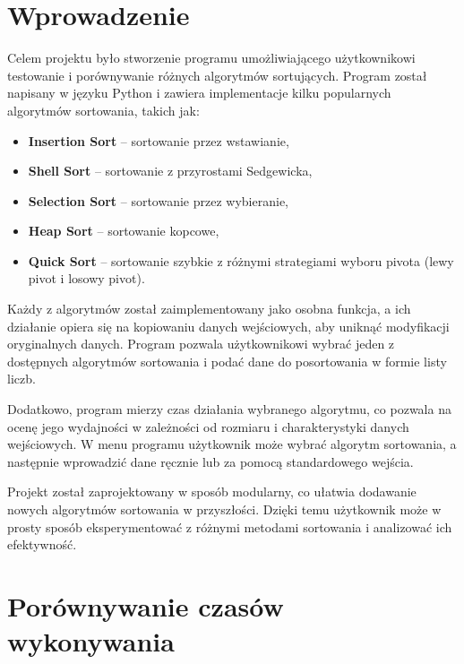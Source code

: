 \documentclass{article}
\begin{document}
	\section{Wprowadzenie}
	
	Celem projektu było stworzenie programu umożliwiającego użytkownikowi testowanie i porównywanie różnych algorytmów sortujących. Program został napisany w języku Python i zawiera implementacje kilku popularnych algorytmów sortowania, takich jak:
	
	\begin{itemize}
		\item \textbf{Insertion Sort} – sortowanie przez wstawianie,
		\item \textbf{Shell Sort} – sortowanie z przyrostami Sedgewicka,
		\item \textbf{Selection Sort} – sortowanie przez wybieranie,
		\item \textbf{Heap Sort} – sortowanie kopcowe,
		\item \textbf{Quick Sort} – sortowanie szybkie z różnymi strategiami wyboru pivota (lewy pivot i losowy pivot).
	\end{itemize}
	
	Każdy z algorytmów został zaimplementowany jako osobna funkcja, a ich działanie opiera się na kopiowaniu danych wejściowych, aby uniknąć modyfikacji oryginalnych danych. Program pozwala użytkownikowi wybrać jeden z dostępnych algorytmów sortowania i podać dane do posortowania w formie listy liczb.
	
	Dodatkowo, program mierzy czas działania wybranego algorytmu, co pozwala na ocenę jego wydajności w zależności od rozmiaru i charakterystyki danych wejściowych. W menu programu użytkownik może wybrać algorytm sortowania, a następnie wprowadzić dane ręcznie lub za pomocą standardowego wejścia.
	
	Projekt został zaprojektowany w sposób modularny, co ułatwia dodawanie nowych algorytmów sortowania w przyszłości. Dzięki temu użytkownik może w prosty sposób eksperymentować z różnymi metodami sortowania i analizować ich efektywność.
\newpage
	
	\section{Porównywanie czasów wykonywania}
\end{document}
